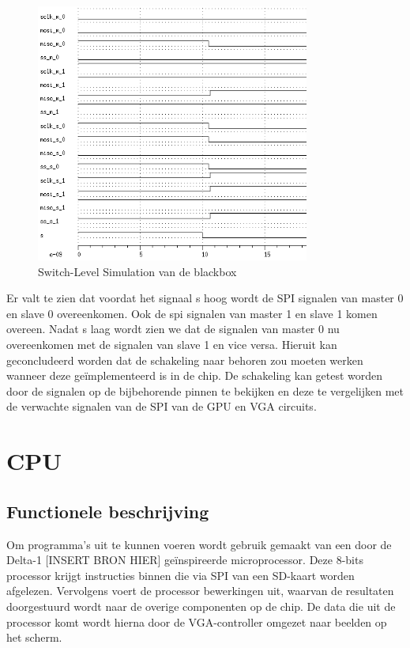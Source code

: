 \documentclass[oneside,dutch]{tudelft-report}
\begin{document}
\begin{figure}[H]
\center
\includegraphics[width=9cm]{./BlackBox_SLS}
\caption{Switch-Level Simulation van de blackbox}
\label{bbsls}
\end{figure}

Er valt te zien dat voordat het signaal s hoog wordt de SPI signalen van master 0 en slave 0 overeenkomen. Ook de spi signalen van master 1 en slave 1 komen overeen. Nadat s laag wordt zien we dat de signalen van master 0 nu overeenkomen met de signalen van slave 1 en vice versa. Hieruit kan geconcludeerd worden dat de schakeling naar behoren zou moeten werken wanneer deze geïmplementeerd is in de chip. De schakeling kan getest worden door de signalen op de bijbehorende pinnen te bekijken en deze te vergelijken met de verwachte signalen van de SPI van de GPU en VGA circuits. 

\newpage

\chapter{CPU}
\section{Functionele beschrijving}
Om programma’s uit te kunnen voeren wordt gebruik gemaakt van een door de Delta-1 [INSERT BRON HIER] geïnspireerde microprocessor. Deze 8-bits processor krijgt instructies binnen die via SPI van een SD-kaart worden afgelezen. Vervolgens voert de processor bewerkingen uit, waarvan de resultaten doorgestuurd wordt naar de overige componenten op de chip. De data die uit de processor komt wordt hierna door de VGA-controller omgezet naar beelden op het scherm.
\end{document}
